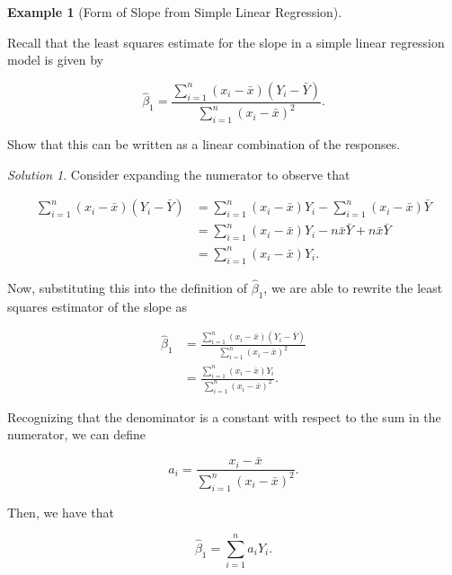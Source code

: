 \documentclass[
  letterpaper,
  DIV=11,
  numbers=noendperiod]{scrreprt}
\theoremstyle{plain}
\theoremstyle{definition}
\theoremstyle{definition}
\newtheorem{example}{Example}[chapter]
\theoremstyle{remark}
\newtheorem*{solution}{Solution}
\begin{document}
\begin{example}[Form of Slope from Simple Linear
Regression]\protect\hypertarget{exm-slope-linear-combination}{}\label{exm-slope-linear-combination}

Recall that the least squares estimate for the slope in a simple linear
regression model is given by

\[\widehat{\beta}_1 = \frac{\sum_{i=1}^{n} \left(x_i - \bar{x}\right)\left(Y_i - \bar{Y}\right)}{\sum_{i=1}^{n} \left(x_i - \bar{x}\right)^2}.\]

Show that this can be written as a linear combination of the responses.

\end{example}

\begin{solution}

Consider expanding the numerator to observe that

\[
\begin{aligned}
  \sum_{i=1}^{n} \left(x_i - \bar{x}\right) \left(Y_i - \bar{Y}\right)
    &= \sum_{i=1}^{n} \left(x_i - \bar{x}\right) Y_i - \sum_{i=1}^{n} \left(x_i - \bar{x}\right) \bar{Y} \\
    &= \sum_{i=1}^{n} \left(x_i - \bar{x}\right) Y_i - n\bar{x}\bar{Y} + n\bar{x}\bar{Y} \\
    &= \sum_{i=1}^{n} \left(x_i - \bar{x}\right) Y_i.
\end{aligned}
\]

Now, substituting this into the definition of \(\widehat{\beta}_1\), we
are able to rewrite the least squares estimator of the slope as

\[
\begin{aligned}
  \widehat{\beta}_1
    &= \frac{\sum_{i=1}^{n} \left(x_i - \bar{x}\right)\left(Y_i - \bar{Y}\right)}{\sum_{i=1}^{n} \left(x_i - \bar{x}\right)^2} \\
    &= \frac{\sum_{i=1}^{n} \left(x_i - \bar{x}\right) Y_i}{\sum_{i=1}^{n} \left(x_i - \bar{x}\right)^2}. 
\end{aligned}
\]

Recognizing that the denominator is a constant with respect to the sum
in the numerator, we can define

\[a_i = \frac{x_i - \bar{x}}{\sum_{i=1}^{n} \left(x_i - \bar{x}\right)^2}.\]

Then, we have that

\[\widehat{\beta}_1 = \sum_{i=1}^{n} a_i Y_i.\]

\end{solution}
\end{document}
